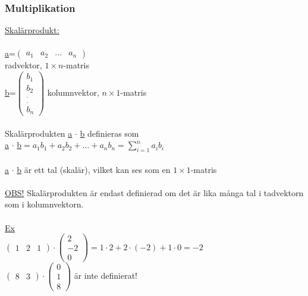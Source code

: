 \documentclass{article}
\begin{document}
        \subsubsection{Multiplikation}
        \underline{Skalärprodukt:}\\\\
        \underline{a}=$\begin{pmatrix}
            a_{1} & a_{2} & ... & a_{n}
        \end{pmatrix}$\\
        radvektor, $1\times n$-matris\\
        \underline{b}=$\begin{pmatrix}
            b_{1}\\
            b_{2}\\
            ^{.}_{.}\\
            b_{n}
        \end{pmatrix}$ kolumnvektor, $n\times 1$-matris\\\\
        Skalärprodukten \underline{a} $\cdot$ \underline{b} definieras som \\
        \underline{a} $\cdot$ \underline{b}$=a_{1}b_{1}+a_{2}b_{2}+\ldots+a_{n}b_{n}=\sum_{i=1}^{n}a_{i}b_{i}$\\\\
        \underline{a} $\cdot$ \underline{b} är ett tal (skalär), vilket kan ses som en $1\times 1$-matris\\\\
        \underline{OBS!} Skalärprodukten är endast definierad om det är lika många tal i tadvektorn som i kolumnvektorn.\\\\
        \underline{Ex}\\
        $\begin{pmatrix}
            1 & 2 & 1
        \end{pmatrix} \cdot \begin{pmatrix}
            2\\
            -2\\
            0
        \end{pmatrix}=1\cdot 2+2\cdot (-2)+1\cdot 0=-2$\\
        $\begin{pmatrix}
            8 & 3
        \end{pmatrix}\cdot \begin{pmatrix}
            0\\
            1\\
            8
        \end{pmatrix}$ är inte definierat!\\
\end{document}
